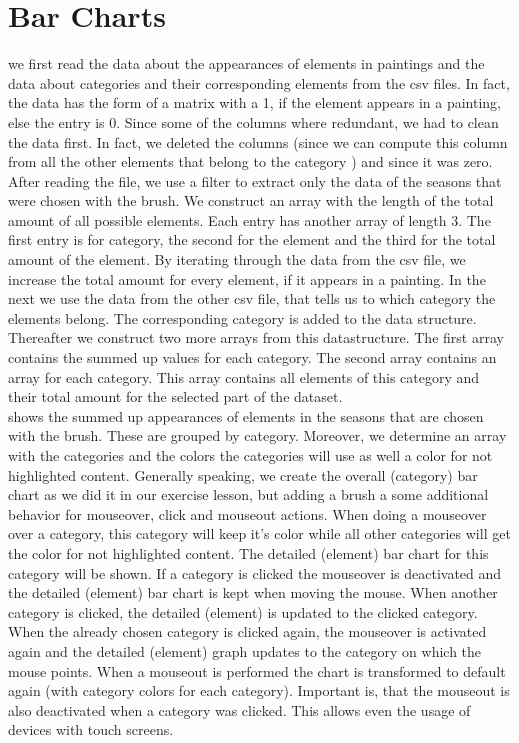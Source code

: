 \documentclass[a4paper]{tufte-book}
\newcommand{\quo}[1]{\flqq{#1}\frqq}
\begin{document}
\section{Bar Charts}
 we first read the data about the appearances of elements in paintings and the data about categories and their corresponding elements from the csv files. In fact, the data has the form of a matrix with a 1, if the element appears in a painting, else the entry is 0. Since some of the columns where redundant, we had to clean the data first. In fact, we deleted the columns \quo{frames} (since we can compute this column from all the other elements that belong to the category \quo{frames}) and \quo{lakes} since it was zero. After reading the file, we use a filter to extract only the data of the seasons that were chosen with the brush. We construct an array with the length of the total amount of all possible elements. Each entry has another array of length 3. The first entry is for category, the second for the element and the third for the total amount of the element. By iterating through the data from the csv file, we increase the total amount for every element, if it appears in a painting. In the next we use the data from the other csv file, that tells us to which category the elements belong. The corresponding category is added to the data structure. Thereafter we construct two more arrays from this datastructure. The first array contains the summed up values for each category. The second array contains an array for each category. This array contains all elements of this category and their total amount for the selected part of the dataset. \\

 shows the summed up appearances of elements in the seasons that are chosen with the brush. These are grouped by category. Moreover, we determine an array with the categories and the colors the categories will use as well a color for not highlighted content. Generally speaking, we create the overall (category) bar chart as we did it in our exercise lesson, but adding a brush a some additional behavior for mouseover, click and mouseout actions. When doing a mouseover over a category, this category will keep it's color while all other categories will get the color for not highlighted content. The detailed (element) bar chart for this category will be shown.
If a category is clicked the mouseover is deactivated and the detailed (element) bar chart is kept when moving the mouse. When another category is clicked, the detailed (element) is updated to the clicked category. When the already chosen category is clicked again, the mouseover is activated again and the detailed (element) graph updates to the category on which the mouse points. When a mouseout is performed the chart is transformed to default again (with category colors for each category). Important is, that the mouseout is also deactivated when a category was clicked. This allows even the usage of devices with touch screens. \\
\end{document}
